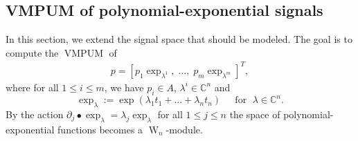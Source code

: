 \documentclass[a4paper,10pt]{article}
\newtheorem{ex}[Th]{Example}
\theoremstyle{nonumberplain}
\newcommand{\R}{\mathbb{R}}
\newcommand{\C}{\mathbb{C}}
\DeclareMathOperator{\W}{W}
\DeclareMathOperator{\VMPUM}{VMPUM}
\begin{document}



\subsection{VMPUM of polynomial-exponential signals}

In this section, we extend the signal space that should be modeled. The goal is to compute the $\VMPUM$ of 
\begin{eqnarray}\label{expvektor}
p=[p_1 \exp_{\lambda^1}, \; \dots, \; p_m \exp_{\lambda^m}]^T ,
\end{eqnarray}
where for all $1 \leq i \leq m$, we have $p_i \in A$, $\lambda^i \in \C^n$ and 
$$ \exp_{\lambda}:=\exp(\lambda_1 t_1 + \dots + \lambda_n t_n) \;\;\; \; \mbox{ for } \; \lambda \in \C^n.$$
By the action 
$\partial_j \bullet \exp_\lambda = \lambda_j \exp_\lambda$ for all $1 \leq j \leq n$
the space of polynomial-exponential functions becomes a $\W_n$-module. 
\end{document}
